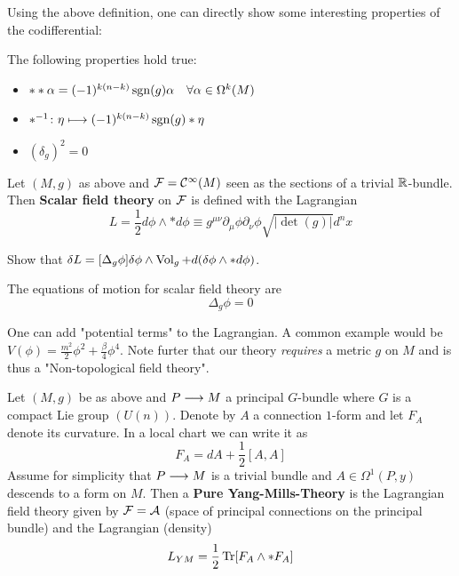Using the above definition, one can directly show some interesting properties of the codifferential:

\begin{lem}
  The following properties hold true:
  \begin{itemize}
    \item $**\alpha = (-1)^{k(n-k)} \operatorname{sgn}(g)\alpha \quad \forall \alpha \in \Omega^k(M)$
    \item $*^{-1}\colon \eta \longmapsto (-1)^{k(n-k)} \operatorname{sgn}(g) *\eta$
    \item $(\delta_g)^2 = 0$
  \end{itemize}
\end{lem}


\begin{definition}
  Let $(M,g)$ as above and ${\mathcal{F}}= \mathcal{C}^{\infty}(M)$ seen as the sections of a trivial $\mathbb{R}$-bundle. Then \textbf{Scalar field theory} on ${\mathcal{F}}$ is defined with the Lagrangian
  $$ L = \frac{1}{2} d \phi \wedge * d\phi \equiv  g^{\mu\nu} \partial_\mu \phi \partial_\nu \phi \sqrt{|\det(g)|} d^n x $$
\end{definition}

\begin{ex}
  Show that $ \delta L = [\Delta_g \phi] \delta \phi \wedge \vol_g + d(\delta\phi \wedge * d\phi)$.
\end{ex}

The equations of motion for scalar field theory are
$$ \Delta_g \phi = 0 $$

\begin{rem}
  One can add "potential terms" to the Lagrangian. A common example would be $V(\phi) = \frac{m^2}{2} \phi^2 + \frac{\beta}{4} \phi^4$. Note furter that our theory \emph{requires} a metric $g$ on $M$ and is thus a "Non-topological field theory".
\end{rem}

\begin{definition}
  Let $(M,g)$ be as above and $P \longrightarrow M$ a principal $G$-bundle where $G$ is a compact Lie group $(U(n))$. Denote by $A$ a connection $1$-form and let $F_A$ denote its curvature. In a local chart we can write it as
  $$ F_A = dA + \frac{1}{2}[A,A] $$
  Assume for simplicity that $P \longrightarrow M$ is a trivial bundle and $A \in \Omega^1(P,y)$ descends to a form on $M$. Then a \textbf{Pure Yang-Mills-Theory} is the Lagrangian field theory given by ${\mathcal{F}} = \mathcal{A}$ (space of principal connections on the principal bundle) and the Lagrangian (density)
  $$ L_{YM} = \frac{1}{2} \operatorname{Tr}[F_A \wedge * F_A] $$
\end{definition}

